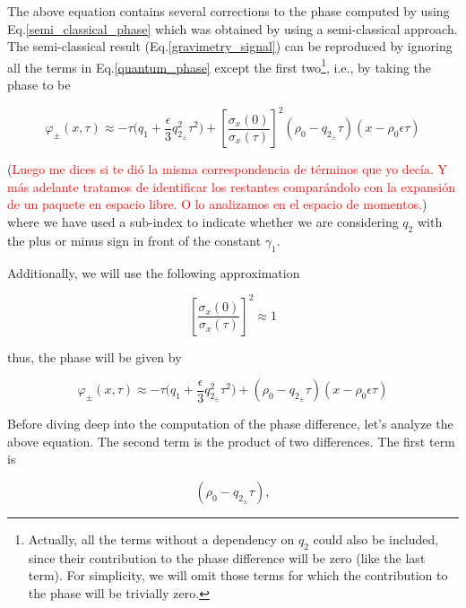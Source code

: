 \documentclass{article}
\begin{document}
The above equation contains several corrections to the phase computed by using Eq.\ref{semi_classical_phase} which was obtained by using a semi-classical approach. The semi-classical result (Eq.\ref{gravimetry_signal}) can be reproduced by ignoring all the terms in Eq.\ref{quantum_phase} except the first two\footnote{Actually, all the terms without a dependency on $q_{2}$ could also be included, since their contribution to the phase difference will be zero (like the last term). For simplicity, we will omit those terms for which the contribution to the phase will be trivially zero.}, i.e., by taking the phase to be

\begin{equation}\label{pre_approx_quantum_phase}
\varphi_{\pm}(x, \tau) \approx -\tau \bigg(q_{1} + \frac{\epsilon}{3} q_{2_{\pm}}^{2} \tau^{2}\bigg) + \left[\frac{\sigma_{x}(0)}{\sigma_{x}(\tau)} \right]^{2} (\rho_{0} - q_{2_{\pm}} \tau)(x-\rho_{0} \epsilon \tau)
\end{equation}

(\textcolor{red}{Luego me dices si te dió la misma correspondencia de términos que yo decía. Y más adelante tratamos de identificar los restantes comparándolo con la expansión de un paquete en espacio libre. O lo analizamos en el espacio de momentos.}) where we have used a sub-index to indicate whether we are considering $q_{2}$ with the plus or minus sign in front of the constant $\gamma_{1}$. 

Additionally, we will use the following approximation

\begin{equation}\label{sigma_quotient_approx}
\left[\frac{\sigma_{x}(0)}{\sigma_{x}(\tau)} \right]^{2} \approx 1
\end{equation}

thus, the phase will be given by

\begin{equation}\label{approx_quantum_phase}
\varphi_{\pm}(x, \tau) \approx -\tau \bigg(q_{1} + \frac{\epsilon}{3} q_{2_{\pm}}^{2} \tau^{2}\bigg) + (\rho_{0} - q_{2_{\pm}} \tau)(x-\rho_{0} \epsilon \tau)
\end{equation}

Before diving deep into the computation of the phase difference, let's analyze the above equation. The second term is the product of two differences. The first term is 

\begin{equation}\label{momentum_change}
(\rho_{0} - q_{2_{\pm}} \tau),
\end{equation}
\end{document}
